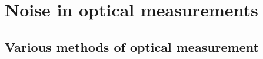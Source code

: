 \chapter{Noise in optical measurements}


\section{Various methods of optical measurement}
\label{section:noise_in_optical_measurement}







